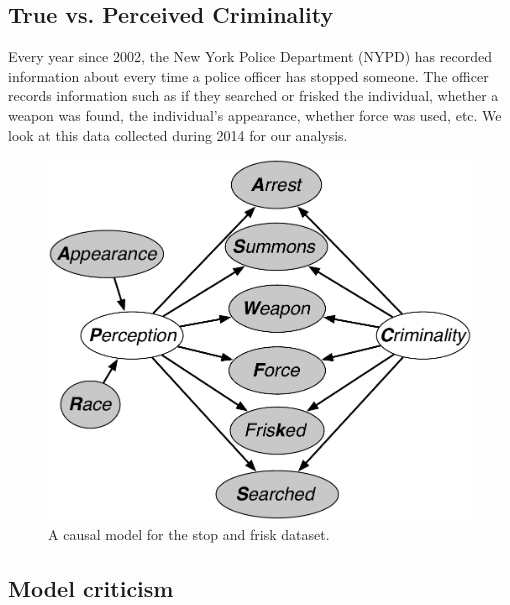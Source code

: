 \subsection{True vs. Perceived Criminality}
Every year since 2002, the New York Police Department (NYPD) has recorded information about every time a police officer has stopped someone. The officer records information such as if they searched or frisked the individual, whether a weapon was found, the individual's appearance, whether force was used, etc. We look at this data collected during 2014 for our analysis.


\begin{figure}[th]
\begin{center}
\vspace{-1ex}
\centerline{\includegraphics[width=\columnwidth]{stop_and_frisk_model3.pdf}}
\vspace{-2ex}
\caption{A causal model for the stop and frisk dataset.\label{figure.stop_and_frisk}}
\vspace{-2ex}
\end{center}
\end{figure}


\subsection{Model criticism}

